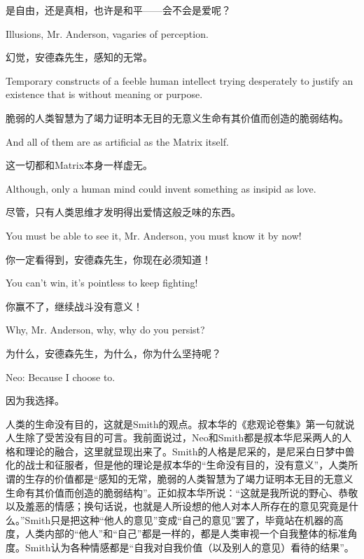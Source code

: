 \documentclass[UTF8]{ctexart}
\newenvironment{myquote}{\color{green} \setlength{\leftskip}{6em} \setlength{\rightskip}{4em} \setlength{\parindent}{-2em}}{\par}
\begin{document}
是自由，还是真相，也许是和平——会不会是爱呢？

\begin{myquote}
Illusions, Mr. Anderson, vagaries of perception.
\end{myquote}

幻觉，安德森先生，感知的无常。

\begin{myquote}
Temporary constructs of a feeble human intellect trying desperately to justify an existence that is without meaning or purpose.
\end{myquote}

脆弱的人类智慧为了竭力证明本无目的无意义生命有其价值而创造的脆弱结构。

\begin{myquote}
And all of them are as artificial as the Matrix itself.
\end{myquote}

这一切都和Matrix本身一样虚无。

\begin{myquote}
Although, only a human mind could invent something as insipid as love.
\end{myquote}

尽管，只有人类思维才发明得出爱情这般乏味的东西。

\begin{myquote}
You must be able to see it, Mr. Anderson, you must know it by now!
\end{myquote}

你一定看得到，安德森先生，你现在必须知道！

\begin{myquote}
You can't win, it's pointless to keep fighting!
\end{myquote}

你赢不了，继续战斗没有意义！

\begin{myquote}
Why, Mr. Anderson, why, why do you persist?
\end{myquote}

为什么，安德森先生，为什么，你为什么坚持呢？

\begin{myquote}
Neo: Because I choose to.
\end{myquote}

因为我选择。

人类的生命没有目的，这就是Smith的观点。叔本华的《悲观论卷集》第一句就说人生除了受苦没有目的可言。我前面说过，Neo和Smith都是叔本华尼采两人的人格和理论的融合，这里就显现出来了。Smith的人格是尼采的，是尼采白日梦中兽化的战士和征服者，但是他的理论是叔本华的“生命没有目的，没有意义”，人类所谓的生存的价值都是“感知的无常，脆弱的人类智慧为了竭力证明本无目的无意义生命有其价值而创造的脆弱结构”。正如叔本华所说：“这就是我所说的野心、恭敬以及羞恶的情感；换句话说，也就是人所设想的他人对本人所存在的意见究竟是什么。”Smith只是把这种“他人的意见”变成“自己的意见”罢了，毕竟站在机器的高度，人类内部的“他人”和“自己”都是一样的，都是人类审视一个自我整体的标准角度。Smith认为各种情感都是“自我对自我价值（以及别人的意见）看待的结果”。
\end{document}
